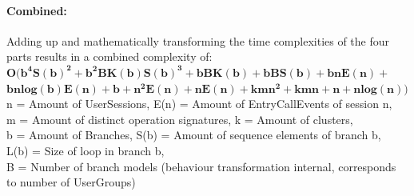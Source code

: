 \documentclass[10pt,a4paper]{article}
\begin{document}
\paragraph{Combined:}
Adding up and mathematically transforming the time complexities of the four parts results in a combined complexity of:\\
$\mathbf{O(b^4 S(b)^2 + b^2 B K(b) S(b)^3 + b B K(b) + b B S(b) + b n E(n) + }$\\$\mathbf{b n log(b) E(n) + b + n^2 E(n) + n E(n) + k m n^2 + k m n + n + n log(n))}$\\
n = Amount of UserSessions, E(n) = Amount of EntryCallEvents of session n, \\
m = Amount of distinct operation signatures, k = Amount of clusters, \\
b = Amount of Branches, S(b) = Amount of sequence elements of branch b, \\
L(b) = Size of loop in branch b,\\
B = Number of branch models (behaviour transformation internal, corresponds to number of UserGroups)
\end{document}
